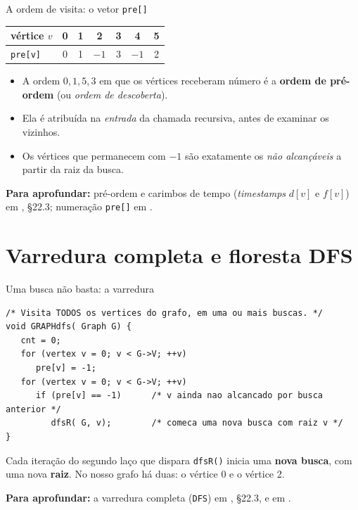 \documentclass[aspectratio=169]{beamer}
\newcommand{\fonte}[1]{%
  \vfill
  {\tiny\color{gray!55!black}\textbf{Para aprofundar:} #1\par}%
}
\begin{document}
\begin{frame}{A ordem de visita: o vetor \texttt{pre[]}}
  \begin{center}
  {\small
  \begin{tabular}{lcccccc}
    \toprule
    vértice $v$   & 0 & 1 & 2 & 3 & 4 & 5 \\
    \midrule
    \texttt{pre[v]} & 0 & 1 & $-1$ & 3 & $-1$ & 2 \\
    \bottomrule
  \end{tabular}}
  \end{center}
  \medskip
  {\small
  \begin{itemize}\small
    \item A ordem $0, 1, 5, 3$ em que os vértices receberam número é a
          \textbf{ordem de pré-ordem} (ou \emph{ordem de descoberta}).
    \item Ela é atribuída na \emph{entrada} da chamada recursiva, antes de
          examinar os vizinhos.
    \item Os vértices que permanecem com $-1$ são exatamente os
          \emph{não alcançáveis} a partir da raiz da busca.
  \end{itemize}}
  \fonte{pré-ordem e carimbos de tempo (\emph{timestamps} $d[v]$ e $f[v]$) em
  \cite{cormen2009introduction}, §22.3; numeração \texttt{pre[]} em
  \cite{feofiloff2020algoritmos}.}
\end{frame}

\section{Varredura completa e floresta DFS}

\begin{frame}[fragile]{Uma busca não basta: a varredura}
\begin{lstlisting}
/* Visita TODOS os vertices do grafo, em uma ou mais buscas. */
void GRAPHdfs( Graph G) {
   cnt = 0;
   for (vertex v = 0; v < G->V; ++v)
      pre[v] = -1;
   for (vertex v = 0; v < G->V; ++v)
      if (pre[v] == -1)      /* v ainda nao alcancado por busca anterior */
         dfsR( G, v);        /* comeca uma nova busca com raiz v */
}
\end{lstlisting}
  {\scriptsize Cada iteração do segundo laço que dispara \texttt{dfsR()} inicia
  uma \textbf{nova busca}, com uma nova \textbf{raiz}. No nosso grafo há duas:
  o vértice 0 e o vértice 2.}
  \fonte{a varredura completa (\texttt{DFS}) em \cite{cormen2009introduction},
  §22.3, e em \cite{feofiloff2020algoritmos}.}
\end{frame}
\end{document}
